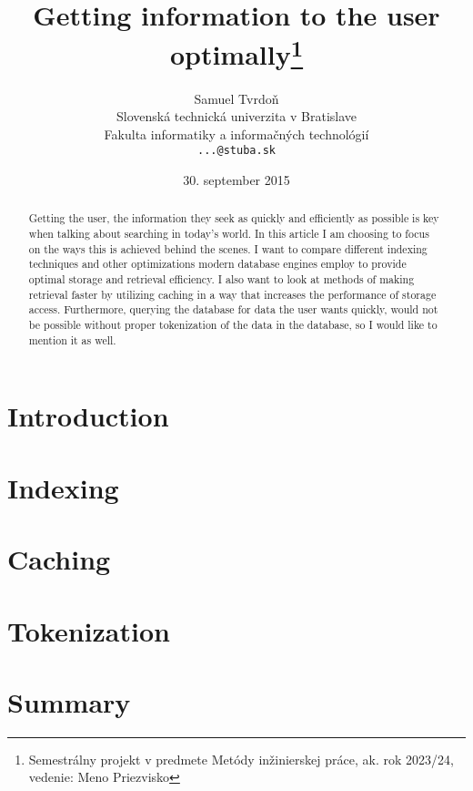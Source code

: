 \documentclass[10pt,a4paper]{article}
\title{Getting information to the user optimally\thanks{Semestrálny projekt v predmete Metódy inžinierskej práce, ak. rok 2023/24, vedenie: Meno Priezvisko}} %
\author{Samuel Tvrdoň\\[2pt]
	{\small Slovenská technická univerzita v Bratislave}\\
	{\small Fakulta informatiky a informačných technológií}\\
	{\small \texttt{...@stuba.sk}}
	}
\date{\small 30. september 2015} %
\begin{document}
\maketitle

\begin{abstract}
Getting the user, the information they seek as quickly and efficiently as possible is key when talking about searching in today’s world. In this article I am choosing to focus on the ways this is achieved behind the scenes. I want to compare different indexing techniques and other optimizations modern database engines employ to provide optimal storage and retrieval efficiency. I also want to look at methods of making retrieval faster by utilizing caching in a way that increases the performance of storage access. Furthermore, querying the database for data the user wants quickly, would not be possible without proper tokenization of the data in the database, so I would like to mention it as well.
\end{abstract}

\section{Introduction}

\lipsum[1]

\section{Indexing}
\lipsum[1-4]

\section{Caching}
\lipsum[2]

\section{Tokenization}
\lipsum[1]

\section{Summary}
\lipsum[1]

\newpage
\end{document}
